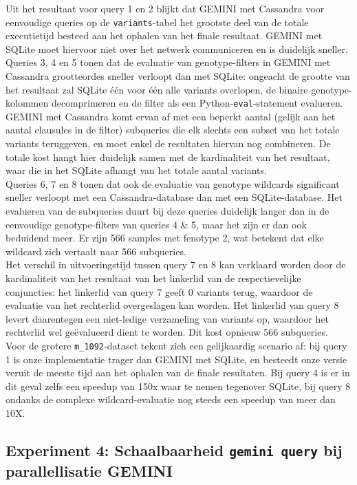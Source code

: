 Uit het resultaat voor query 1 en 2 blijkt dat GEMINI met Cassandra voor eenvoudige queries op de \texttt{variants}-tabel het grootste deel van de totale executietijd besteed aan het ophalen van het finale resultaat. GEMINI met SQLite moet hiervoor niet over het netwerk communiceren en is duidelijk sneller.\\
Queries 3, 4 en 5 tonen dat de evaluatie van genotype-filters in GEMINI met Cassandra grootteordes sneller verloopt dan met SQLite: ongeacht de grootte van het resultaat zal SQLite \'e\'en voor \'e\'en alle variants overlopen, de binaire genotype-kolommen decomprimeren en de filter als een Python-\texttt{eval}-statement evalueren. GEMINI met Cassandra komt ervan af met een beperkt aantal (gelijk aan het aantal clausules in de filter) subqueries die elk slechts een subset van het totale variants teruggeven, en moet enkel de resultaten hiervan nog combineren. De totale kost hangt hier duidelijk samen met de kardinaliteit van het resultaat, waar die in het SQLite afhangt van het totale aantal variants.\\
Queries 6, 7 en 8 tonen dat ook de evaluatie van genotype wildcards significant sneller verloopt met een Cassandra-database dan met een SQLite-database. Het evalueren van de subqueries duurt bij deze queries duidelijk langer dan in de eenvoudige genotype-filters van queries 4 \& 5, maar het zijn er dan ook beduidend meer. Er zijn 566 samples met fenotype 2, wat betekent dat elke wildcard zich vertaalt naar 566 subqueries. \\
Het verschil in uitvoeringstijd tussen query 7 en 8 kan verklaard worden door de kardinaliteit van het resultaat van het linkerlid van de respectievelijke conjuncties: het linkerlid van query 7 geeft 0 variants terug, waardoor de evaluatie van het rechterlid overgeslagen kan worden. Het linkerlid van query 8 levert daarentegen een niet-ledige verzameling van variants op, waardoor het rechterlid wel ge\"evalueerd dient te worden. Dit kost opnieuw 566 subqueries.\\

Voor de grotere \texttt{m\_1092}-dataset tekent zich een gelijkaardig scenario af: bij query 1 is onze implementatie trager dan GEMINI met SQLite, en besteedt onze versie veruit de meeste tijd aan het ophalen van de finale resultaten. Bij query 4 is er in dit geval zelfs een speedup van 150x waar te nemen tegenover SQLite, bij query 8 ondanks de complexe wildcard-evaluatie nog steeds een speedup van meer dan 10X. 

\subsection{Experiment 4: Schaalbaarheid \texttt{gemini query} bij parallellisatie GEMINI}
\label{exp4}

